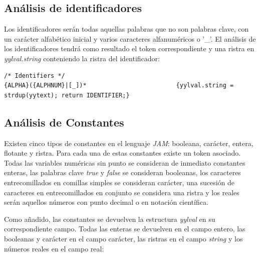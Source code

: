 \documentclass[a4paper,10pt]{article}
\begin{document}
\subsection{Análisis de identificadores}

Los identificadores serán todas aquellas palabras que no son palabras clave, con un carácter alfabético inicial y varios caracteres alfanuméricos o '\_'. El análisis de los identificadores tendrá como resultado el token correspondiente y una ristra en \textit{yylval.string} conteniendo la ristra del identificador:

\begin{lstlisting}
/* Identifiers */
{ALPHA}({ALPHNUM}|[_])* 						{yylval.string = strdup(yytext); return IDENTIFIER;}
\end{lstlisting}

\subsection{Análisis de Constantes}
Existen cinco tipos de constantes en el lenguaje \textit{JAM}: booleana, carácter, entera, flotante y ristra. Para cada una de estas constantes existe un token asociado. Todas las variables numéricas sin punto se consideran de inmediato constantes enteras, las palabras clave \emph{true} y \emph{false} se consideran booleanas, los caracteres entrecomillados en comillas simples se consideran carácter, una sucesión de caracteres en entrecomillados en conjunto se considera una ristra y los reales serán aquellos números con punto decimal o en notación científica. 

Como añadido, las constantes se devuelven la estructura \textit{yylval} en su correspondiente campo. Todas las enteras se devuelven en el campo entero, las booleanas y carácter en el campo carácter, las ristras en el campo \textit{string} y los números reales en el campo real:
\end{document}
